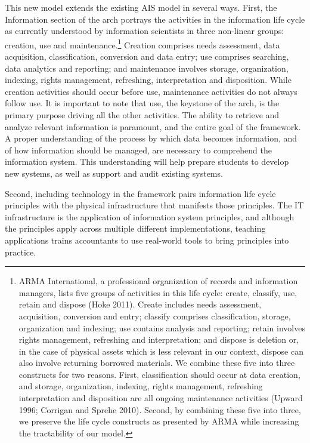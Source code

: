 \documentclass[12pt]{article}
\begin{document}
This new model extends the existing AIS model in several ways. First, the Information section of the arch portrays the activities in the information life cycle as currently understood by information scientists in three non-linear groups: creation, use and maintenance.\footnote{ARMA International, a professional organization of records and information managers, lists five groups of activities in this life cycle: create, classify, use, retain and dispose (Hoke 2011). Create includes needs assessment, acquisition, conversion and entry; classify comprises classification, storage, organization and indexing; use contains analysis and reporting; retain involves rights management, refreshing and interpretation; and dispose is deletion or, in the case of physical assets which is less relevant in our context, dispose can also involve returning borrowed materials. We combine these five into three constructs for two reasons. First, classification should occur at data creation, and storage, organization, indexing, rights management, refreshing interpretation and disposition are all ongoing maintenance activities (Upward 1996; Corrigan and Sprehe 2010). Second, by combining these five into three, we preserve the life cycle constructs as presented by ARMA while increasing the tractability of our model.} Creation comprises needs assessment, data acquisition, classification, conversion and data entry; use comprises searching, data analytics and reporting; and maintenance involves storage, organization, indexing, rights management, refreshing, interpretation and disposition. While creation activities should occur before use, maintenance activities do not always follow use. It is important to note that use, the keystone of the arch, is the primary purpose driving all the other activities. The ability to retrieve and analyze relevant information is paramount, and the entire goal of the framework. A proper understanding of the process by which data becomes information, and of how information should be managed, are necessary to comprehend the information system. This understanding will help prepare students to develop new systems, as well as support and audit existing systems.

Second, including technology in the framework pairs information life cycle principles with the physical infrastructure that manifests those principles. The IT infrastructure is the application of information system principles, and although the principles apply across multiple different implementations, teaching applications trains accountants to use real-world tools to bring principles into practice.
\end{document}
